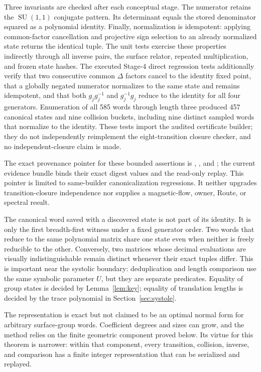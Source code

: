 \documentclass[11pt,a4paper]{article}
\theoremstyle{definition}
\newcommand{\SU}{\operatorname{SU}}
\begin{document}
Three invariants are checked after each conceptual stage.  The numerator
retains the \(\SU(1,1)\) conjugate pattern.  Its determinant equals the stored
denominator squared as a polynomial identity.  Finally, normalization is
idempotent: applying common-factor cancellation and projective sign selection
to an already normalized state returns the identical tuple.  The unit tests
exercise these properties indirectly through all inverse pairs, the surface
relator, repeated multiplication, and frozen state hashes.  The executed
Stage-4 direct regression tests additionally verify that two consecutive
common \(\Delta\) factors cancel to the identity fixed point, that a globally
negated numerator normalizes to the same state and remains idempotent, and
that both \(g_jg_j^{-1}\) and \(g_j^{-1}g_j\) reduce to the identity for all
four generators.  Enumeration of all 585 words through length three produced
457 canonical states and nine collision buckets, including nine distinct
sampled words that normalize to the identity.  These tests import the audited
certificate builder; they do not independently reimplement the
eight-transition closure checker, and no independent-closure claim is made.

The exact provenance pointer for these bounded assertions is
,
, and
; the current evidence bundle
binds their exact digest values and the read-only replay.  This pointer is
limited to same-builder canonicalization regressions.  It neither upgrades
transition-closure independence nor supplies a magnetic-flow, owner, Route,
or spectral result.

The canonical word saved with a discovered state is not part of its identity.
It is only the first breadth-first witness under a fixed generator order.
Two words that reduce to the same polynomial matrix share one state even when
neither is freely reducible to the other.  Conversely, two matrices whose
decimal evaluations are visually indistinguishable remain distinct whenever
their exact tuples differ.  This is important near the systolic boundary:
deduplication and length comparison use the same symbolic parameter \(U\), but
they are separate predicates.  Equality of group states is decided by
Lemma~\ref{lem:key}; equality of translation lengths is decided by the trace
polynomial in Section~\ref{sec:systole}.

The representation is exact but not claimed to be an optimal normal form for
arbitrary surface-group words.  Coefficient degrees and sizes can grow, and
the method relies on the finite geometric component proved below.  Its virtue
for this theorem is narrower: within that component, every transition,
collision, inverse, and comparison has a finite integer representation that
can be serialized and replayed.
\end{document}
